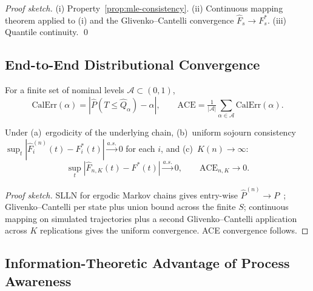 \begin{proof}[Proof sketch]
(i) Property~\ref{prop:mle-consistency}.
(ii) Continuous mapping theorem applied to (i) and the
Glivenko--Cantelli convergence $\hat{F}_s \to F_s^*$.
(iii) Quantile continuity. \qed
\end{proof}

\subsection{End-to-End Distributional Convergence}
\label{sec:prop-convergence}

\begin{definition}
\label{def:calibration}
For a finite set of nominal levels
$\mathcal{A} \subset (0,1)$,
\begin{equation}
\label{eq:calibration}
\text{CalErr}(\alpha) = |\hat{P}(T \leq \hat{Q}_\alpha) - \alpha|,
\qquad
\text{ACE} = \tfrac{1}{|\mathcal{A}|}
    \sum_{\alpha \in \mathcal{A}} \text{CalErr}(\alpha).
\end{equation}
\end{definition}

\begin{theorem}
\label{thm:pipeline-convergence}
Under (a)~ergodicity of the underlying chain, (b)~uniform sojourn
consistency
$\sup_t |\hat{F}_i^{(n)}(t) - F_i^*(t)| \xrightarrow{a.s.} 0$ for each
$i$, and (c)~$K(n) \to \infty$:
\begin{equation}
\label{eq:pipeline-convergence}
\sup_t |\hat{F}_{n,K}(t) - F^*(t)| \xrightarrow{a.s.} 0,
\qquad
\text{ACE}_{n,K} \to 0.
\end{equation}
\end{theorem}

\begin{proof}[Proof sketch]
SLLN for ergodic Markov chains gives entry-wise
$\hat{P}^{(n)}\to P$~\cite{billingsley1961statistical};
Glivenko--Cantelli per state plus union bound across the finite $S$;
continuous mapping on simulated trajectories plus a second
Glivenko--Cantelli application across $K$ replications gives the
uniform convergence. ACE convergence follows.
\end{proof}

\subsection{Information-Theoretic Advantage of Process Awareness}
\label{sec:prop-information}

